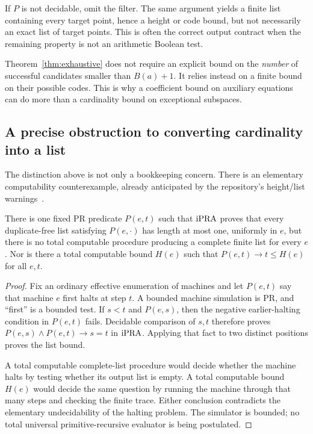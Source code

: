 If \(P\) is not decidable, omit the filter. The same argument yields
a finite list containing every target point, hence a height or code
bound, but not necessarily an exact list of target points. This is
often the correct output contract when the remaining property is
not an arithmetic Boolean test.

Theorem~\ref{thm:exhaustive} does not require an explicit bound on
the \emph{number} of successful candidates smaller than \(B(a)+1\).
It relies instead on a finite bound on their possible codes. This is
why a coefficient bound on auxiliary equations can do more than a
cardinality bound on exceptional subspaces.

\subsection{A precise obstruction to converting cardinality into a list}

The distinction above is not only a bookkeeping concern. There is an
elementary computability counterexample, already anticipated by the
repository's height/list warnings~\cite{repo-faltings,repo-framework}.

\begin{proposition}
\label{prop:singleton}
There is one fixed PR predicate \(P(e,t)\) such that \(\mathrm{iPRA}\) proves
that every duplicate-free list satisfying \(P(e,\cdot)\) has length
at most one, uniformly in \(e\), but there is no total computable
procedure producing a complete finite list for every \(e\). Nor is
there a total computable bound \(H(e)\) such that
\(P(e,t)\to t\le H(e)\) for all \(e,t\).
\end{proposition}

\begin{proof}
Fix an ordinary effective enumeration of machines and let \(P(e,t)\)
say that machine \(e\) first halts at step \(t\). A bounded machine
simulation is PR, and ``first'' is a bounded test. If \(s<t\) and
\(P(e,s)\), then the negative earlier-halting condition in \(P(e,t)\)
fails. Decidable comparison of \(s,t\) therefore proves
\(P(e,s)\wedge P(e,t)\to s=t\) in \(\mathrm{iPRA}\). Applying that fact
to two distinct positions proves the list bound.

A total computable complete-list procedure would decide whether the
machine halts by testing whether its output list is empty. A total
computable bound \(H(e)\) would decide the same question by running
the machine through that many steps and checking the finite trace.
Either conclusion contradicts the elementary undecidability of the
halting problem. The simulator is bounded; no total universal
primitive-recursive evaluator is being postulated.
\end{proof}

